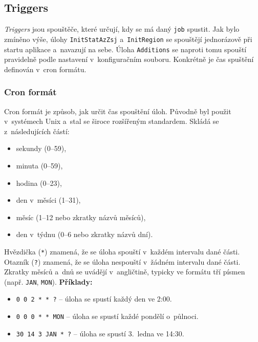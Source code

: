 \subsection{Triggers}
\textit{Triggers} jsou spouštěče, které určují, kdy se má daný \texttt{job} spustit.  
Jak bylo zmíněno výše, úlohy \texttt{InitStatAzZsj} a~\texttt{InitRegion} se spouštějí jednorázově při startu aplikace a~navazují na sebe.  
Úloha \texttt{Additions} se naproti tomu spouští pravidelně podle nastavení v~konfiguračním souboru.  
Konkrétně je čas spuštění definován v~cron formátu.

\subsubsection*{Cron formát}
Cron formát je způsob, jak určit čas spouštění úloh.  
Původně byl použit v~systémech Unix a~stal se široce rozšířeným standardem.  
Skládá se z~následujících částí:
\begin{itemize}
    \item sekundy (0--59),
    \item minuta (0--59),
    \item hodina (0--23),
    \item den v~měsíci (1--31),
    \item měsíc (1--12 nebo zkratky názvů měsíců),
    \item den v~týdnu (0--6 nebo zkratky názvů dní).
\end{itemize}
Hvězdička (\texttt{*}) znamená, že se úloha spouští v~každém intervalu dané části.
Otazník (\texttt{?}) znamená, že se úloha nespouští v~žádném intervalu dané části.
Zkratky měsíců a~dnů se uvádějí v~angličtině, typicky ve formátu tří písmen (např. \texttt{JAN}, \texttt{MON}).
\textbf{Příklady:}
\begin{itemize}
    \item \texttt{0 0 2 * * ?} -- úloha se spustí každý den ve 2:00.
    \item \texttt{0 0 0 * * MON} -- úloha se spustí každé pondělí o~půlnoci.
    \item \texttt{30 14 3 JAN * ?} -- úloha se spustí 3.~ledna ve 14:30.
\end{itemize}

